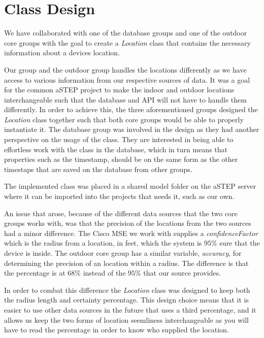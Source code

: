 \section{Class Design}
We have collaborated with one of the database groups and one of the outdoor core groups with the goal to create a \textit{Location} class that contains the necessary information about a devices location. 

Our group and the outdoor group handles the locations differently as we have access to various information from our respective sources of data. It was a goal for the common aSTEP project to make the indoor and outdoor locations interchangeable such that the database and API will not have to handle them differently. In order to achieve this, the three aforementioned groups designed the \textit{Location} class together such that both core groups would be able to properly instantiate it. The database group was involved in the design as they had another perspective on the usage of the class. They are interested in being able to effortless work with the class in the database, which in turn means that properties such as the timestamp, should be on the same form as the other timestaps that are saved on the database from other groups. 

The implemented class was placed in a shared model folder on the aSTEP server %
where it can be imported into the projects that needs it, such as our own. 

An issue that arose, because of the different data sources that the two core groups works with, was that the precision of the locations from the two sources had a minor difference. The Cisco MSE we work with supplies a \textit{confidenceFactor} which is the radius from a location, in feet, which the system is $95\%$ sure that the device is inside\cite{MSE_faq}. The outdoor core group has a similar variable, \textit{accuracy}, for determining the precision of an location within a radius. The difference is that the percentage is at $68\%$ instead of the $95\%$ that our source provides\cite{android_getAccuracy}. 

In order to combat this difference the \textit{Location} class was designed to keep both the radius length and certainty percentage. This design choice means that it is easier to use other data sources in the future that uses a third percentage, and it allows us keep the two forms of location seemliness interchangeable as you will have to read the percentage in order to know who supplied the location.